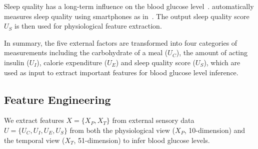 Sleep quality has a long-term influence on the blood glucose level~\cite{bib:DRCP15:Iwasaki}.
\sysname automatically measures sleep quality using smartphones as in~\cite{bib:UbiComp14:Gu}.
The output sleep quality score $U_S$ is then used for physiological feature extraction.

In summary, the five external factors are transformed into four categories of measurements including the carbohydrate of a meal ($U_C$), the amount of acting insulin ($U_I$), calorie expenditure ($U_E$) and sleep quality score ($U_S$), which are used as input to extract important features for blood glucose level inference.

\subsection{Feature Engineering}
\label{subsec:features}
We extract features $X=\{X_P, X_T\}$ from external sensory data $U=\{U_C, U_I, U_E, U_S\}$ from both the physiological view ($X_P$, 10-dimension) and the temporal view ($X_T$, 51-dimension) to infer blood glucose levels.


